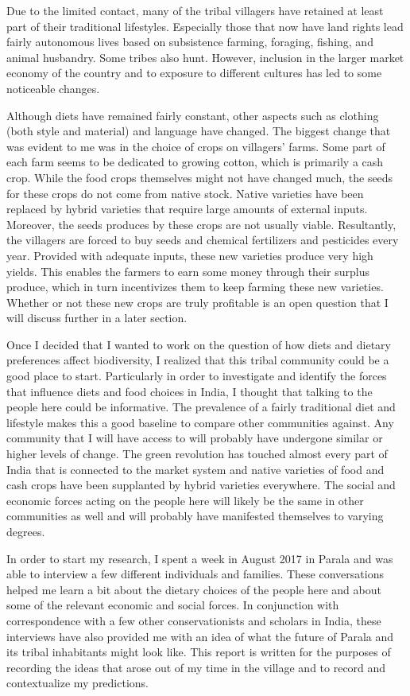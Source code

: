 \documentclass{report}
\begin{document}
Due to the limited contact, many of the tribal villagers have retained at least part of their traditional lifestyles. Especially those that now have land rights lead fairly autonomous lives based on subsistence farming, foraging, fishing, and animal husbandry. Some tribes also hunt. However, inclusion in the larger market economy of the country and to exposure to different cultures has led to some noticeable changes.

Although diets have remained fairly constant, other aspects such as clothing (both style and material) and language have changed. The biggest change that was evident to me was in the choice of crops on villagers' farms. Some part of each farm seems to be dedicated to growing cotton, which is primarily a cash crop. While the food crops themselves might not have changed much, the seeds for these crops do not come from native stock. Native varieties have been replaced by hybrid varieties that require large amounts of external inputs. Moreover, the seeds produces by these crops are not usually viable. Resultantly, the villagers are forced to buy seeds and chemical fertilizers and pesticides every year. Provided with adequate inputs, these new varieties produce very high yields. This enables the farmers to earn some money through their surplus produce, which in turn incentivizes them to keep farming these new varieties. Whether or not these new crops are truly profitable is an open question that I will discuss further in a later section.

Once I decided that I wanted to work on the question of how diets and dietary preferences affect biodiversity, I realized that this tribal community could be a good place to start. Particularly in order to investigate and identify the forces that influence diets and food choices in India, I thought that talking to the people here could be informative. The prevalence of a fairly traditional diet and lifestyle makes this a good baseline to compare other communities against. Any community that I will have access to will probably have undergone similar or higher levels of change. The green revolution has touched almost every part of India that is connected to the market system and native varieties of food and cash crops have been supplanted by hybrid varieties everywhere. The social and economic forces acting on the people here will likely be the same in other communities as well and will probably have manifested themselves to varying degrees.

In order to start my research, I spent a week in August 2017 in Parala and was able to interview a few different individuals and families. These conversations helped me learn a bit about the dietary choices of the people here and about some of the relevant economic and social forces. In conjunction with correspondence with a few other conservationists and scholars in India, these interviews have also provided me with an idea of what the future of Parala and its tribal inhabitants might look like. This report is written for the purposes of recording the ideas that arose out of my time in the village and to record and contextualize my predictions.
\end{document}
